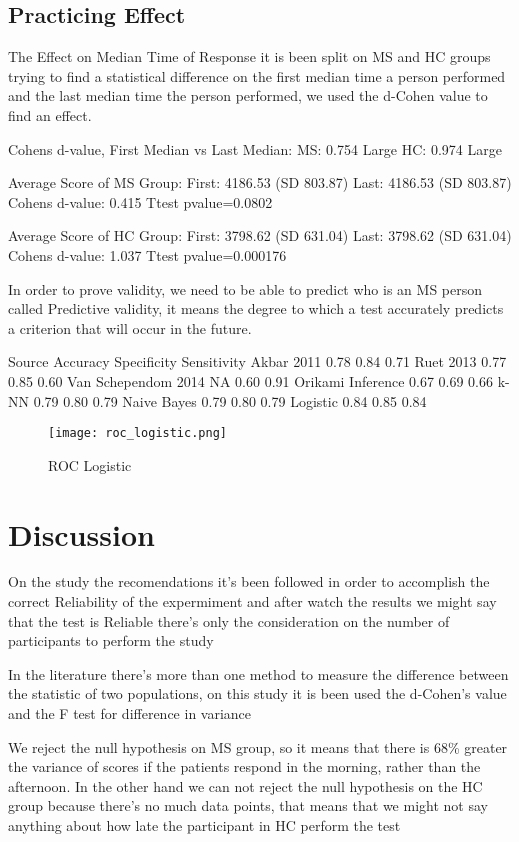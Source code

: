 \documentclass[letterpaper, 10 pt, conference]{ieeeconf}
\begin{document}
\subsection{Practicing Effect}
\vspace{2mm}

The Effect on Median Time of Response it is been split on MS and HC groups trying to find a statistical difference on the first median time a person performed and the last median time the person performed, we used the d-Cohen value to find an effect. 

Cohens d-value, First Median vs Last Median: 
 MS: 0.754 Large 
 HC: 0.974 Large

Average Score of MS Group: 
 First: 4186.53 (SD 803.87) 
 Last: 4186.53 (SD 803.87) 
Cohens d-value: 0.415   Ttest pvalue=0.0802

Average Score of HC Group: 
 First: 3798.62 (SD 631.04) 
 Last: 3798.62 (SD 631.04) 
Cohens d-value: 1.037   Ttest pvalue=0.000176

In order to prove validity, we need to be able to predict who is an MS person called Predictive validity, it means the degree to which a test accurately predicts a criterion that will occur in the future. 

Source	Accuracy	Specificity	Sensitivity
Akbar 2011	0.78	0.84	0.71
Ruet 2013	0.77	0.85	0.60
Van Schependom 2014	NA	0.60	0.91
Orikami
Inference	0.67	0.69	0.66
k-NN	0.79	0.80	0.79
Naive Bayes	0.79	0.80	0.79
Logistic	0.84	0.85	0.84

\begin{figure}[ht]
\texttt{[image: roc\_logistic.png]}
\caption{ROC Logistic}
\label{tab:roc}
\end{figure}


\section{Discussion}

On the study the recomendations it's been followed in order to accomplish the correct Reliability of the expermiment and after watch the results we might say that the test is Reliable there's only the consideration on the number of participants to perform the study

In the literature there's more than one method to measure the difference between the statistic of two populations, on this study it is been used the d-Cohen's value and the F test for difference in variance

We reject the null hypothesis on MS group, so it means that there is 68\% greater the variance of scores if the patients respond in the morning, rather than the afternoon.
In the other hand we can not reject the null hypothesis on the HC group because there's no much data points, that means that we might not say anything about how late the participant in HC perform the test
\end{document}
